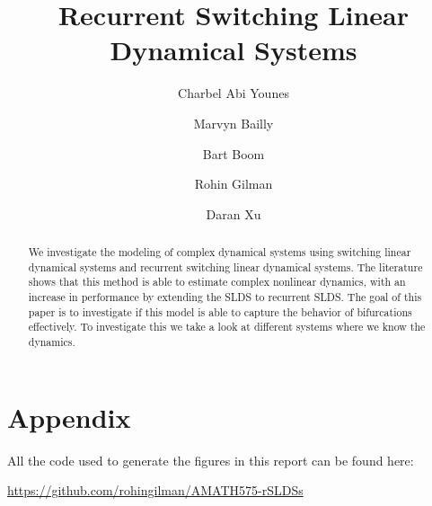 \documentclass{amsart}
\title{Recurrent Switching Linear Dynamical Systems}
\author{Charbel Abi Younes \and Marvyn Bailly \and Bart Boom \and Rohin Gilman \and Daran Xu}
\date{}
\begin{document}
\begin{abstract}
	We investigate the modeling of complex dynamical systems using switching linear dynamical systems and recurrent switching linear dynamical systems. The literature shows that this method is able to estimate complex nonlinear dynamics, with an increase in performance by extending the SLDS to recurrent SLDS. The goal of this paper is to investigate if this model is able to capture the behavior of bifurcations effectively. To investigate this we take a look at different systems where we know the dynamics. 
\end{abstract}

\maketitle









\nocite{linderman_bayesian_2017, zoltowski_unifying_2020, chen_estimating_2015, blei_variational_2017, linderman_dependent_2015}


\section{Appendix}

All the code used to generate the figures in this report can be found here: 

\href{https://github.com/rohingilman/AMATH575-rSLDSs}{https://github.com/rohingilman/AMATH575-rSLDSs}


\end{document}
